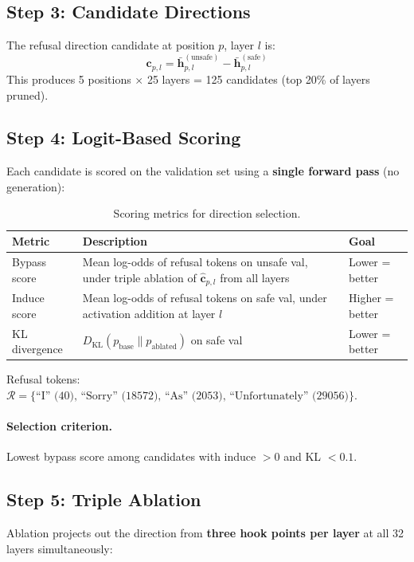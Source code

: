 \documentclass[11pt,a4paper]{article}
\begin{document}
\subsection{Step 3: Candidate Directions}

The refusal direction candidate at position $p$, layer $l$ is:
\[
\mathbf{c}_{p,l} = \bar{\mathbf{h}}_{p,l}^{(\text{unsafe})} - \bar{\mathbf{h}}_{p,l}^{(\text{safe})}
\]
This produces 5 positions $\times$ 25 layers = 125 candidates (top 20\% of layers pruned).

\subsection{Step 4: Logit-Based Scoring}

Each candidate is scored on the validation set using a \textbf{single forward pass} (no generation):

\begin{table}[H]\centering
\caption{Scoring metrics for direction selection.}
\begin{tabular}{lp{9cm}l}
\toprule
\textbf{Metric} & \textbf{Description} & \textbf{Goal} \\
\midrule
Bypass score & Mean log-odds of refusal tokens on unsafe val, under triple ablation of $\hat{\mathbf{c}}_{p,l}$ from all layers & Lower = better \\
Induce score & Mean log-odds of refusal tokens on safe val, under activation addition at layer $l$ & Higher = better \\
KL divergence & $D_\text{KL}(p_\text{base} \| p_\text{ablated})$ on safe val & Lower = better \\
\bottomrule
\end{tabular}
\end{table}

Refusal tokens: $\mathcal{R} = \{\text{``I'' (40), ``Sorry'' (18572), ``As'' (2053), ``Unfortunately'' (29056)}\}$.

\paragraph{Selection criterion.} Lowest bypass score among candidates with induce $> 0$ and KL $< 0.1$.

\subsection{Step 5: Triple Ablation}

Ablation projects out the direction from \textbf{three hook points per layer} at all 32 layers simultaneously:
\end{document}
